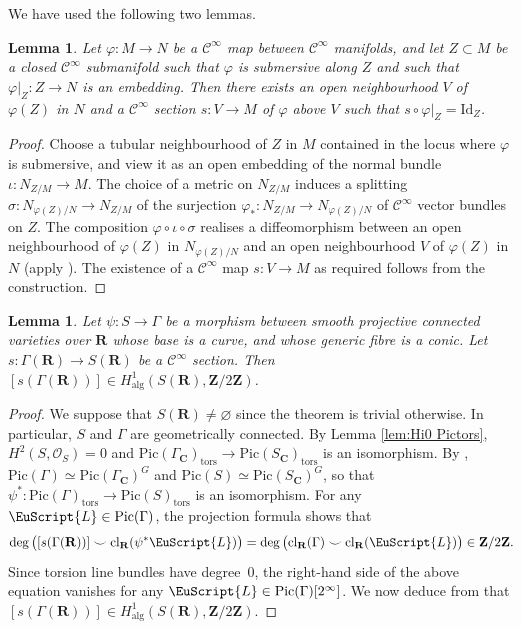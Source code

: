 \documentclass[JEP,XML,SOM,Unicode]{cedram}
\let\mathcal\EuScript
\theoremstyle{plain}
\newtheorem{lem}[thm]{Lemma}
\theoremstyle{definition}
\numberwithin{equation}{section}
\newcommand{\alg}{{\mathrm{alg}}}
\newcommand{\cl}{{\mathrm{cl}}}
\newcommand{\sO}{{\mathscr O}}
\renewcommand{\C}{{\mathbf C}}
\newcommand{\R}{{\mathbf R}}
\newcommand{\Z}{{\mathbf Z}}
\newcommand{\Pic}{\mathrm{Pic}}
\newcommand{\Id}{\mathrm{Id}}
\renewcommand{\phi}{\varphi}
\renewcommand{\emptyset}{\varnothing}
\newcommand{\tors}{{\mathrm{tors}}}
\newcommand{\ci}{\mathscr{C}^{\infty}}
\begin{document}
We have used the following two lemmas.

\begin{lem}
\label{lemtubul}
Let $\phi: M\to N$ be a $\ci$ map between $\ci$ manifolds, and let $Z\subset M$ be a closed $\ci$ submanifold such that $\phi$ is submersive along $Z$ and such that $\phi|_Z: Z\to N$ is an embedding. Then there exists an open neighbourhood $V$ of~$\phi(Z)$ in $N$ and a $\ci$ section $s: V\to M$ of $\phi$ above $V$ such that $s\circ \phi|_Z=\Id_Z$.
\end{lem}

\begin{proof}
Choose a tubular neighbourhood of $Z$ in $M$ contained in the locus where $\phi$ is submersive,
and view it as an open embedding of the normal bundle $\iota: N_{Z/M}\to M$. The choice of a metric on $N_{Z/M}$ induces a splitting $\sigma: N_{\phi(Z)/N}\to N_{Z/M}$ of the surjection $\phi_*:N_{Z/M}\to N_{\phi(Z)/N}$ of $\ci$ vector bundles on $Z$.
The composition $\phi\circ \iota\circ\sigma$ realises a diffeomorphism between an open neighbourhood of $\phi(Z)$ in $N_{\phi(Z)/N}$ and an open neighbourhood $V$ of $\phi(Z)$ in $N$ (apply \cite[Cor.\,A.2.6]{Wall}). The existence of a $\ci$ map $s: V\to M$ as required follows from the construction.
\end{proof}

\begin{lem}
\label{lem:section conic bundle}
Let $\psi:S\to\Gamma$ be a morphism between smooth projective connected varieties over $\R$ whose base is a curve, and whose generic fibre is a conic. Let \hbox{$s:\Gamma(\R)\to S(\R)$} be a $\ci$ section. Then $[s(\Gamma(\R))]\in H^1_\alg(S(\R),\Z/2\Z)$.
\end{lem}

\begin{proof}
We suppose that $S(\R)\neq\emptyset$ since the theorem is trivial otherwise. In particular, $S$ and $\Gamma$ are geometrically connected.
By Lemma \ref{lem:Hi0 Pictors}, $H^2(S,\sO_S)=0$ and $\Pic(\Gamma_{\C})_{\tors}\to \Pic(S_{\C})_{\tors}$ is an isomorphism. By \cite[8.1/4]{neronmodels}, $\Pic(\Gamma)\simeq\Pic(\Gamma_{\C})^G$ and $\Pic(S)\simeq\Pic(S_{\C})^G$,
so that $\psi^*:\Pic(\Gamma)_{\tors}\to \Pic(S)_{\tors}$ is an isomorphism.
For any $\mathcal{L}\in\Pic(\Gamma)$,
the projection formula shows that
\[
\deg\big([s(\Gamma(\R))]\smile\cl_{\R}(\psi^*\mathcal{L})\big)=\deg\big(\cl_{\R}(\Gamma)\smile\cl_{\R}(\mathcal{L})\big)\in\Z/2\Z\rlap{.}
\]
Since torsion line bundles have degree~$0$, the right-hand side of the above equation vanishes for any $\mathcal{L} \in \Pic(\Gamma)[2^\infty]$. We now deduce from \cite[Cor.\,\ref*{BW1-cor:surfaces}\,(i)]{BW1} that $[s(\Gamma(\R))]\in H^1_\alg(S(\R),\Z/2\Z)$.
\end{proof}
\end{document}
